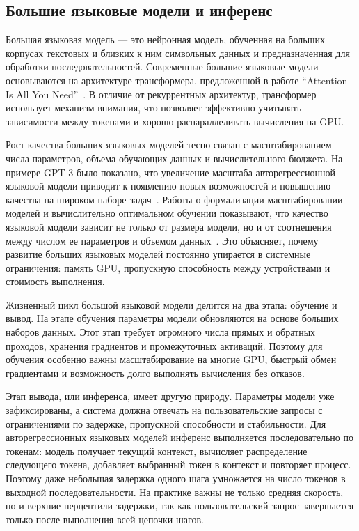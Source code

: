\subsection{Большие языковые модели и инференс}

Большая языковая модель --- это нейронная модель, обученная на больших корпусах текстовых и близких к ним символьных данных и предназначенная для обработки последовательностей. Современные большие языковые модели основываются на архитектуре трансформера, предложенной в работе ``Attention Is All You Need''~\cite{vaswani2017attention}. В отличие от рекуррентных архитектур, трансформер использует механизм внимания, что позволяет эффективно учитывать зависимости между токенами и хорошо распараллеливать вычисления на GPU.

Рост качества больших языковых моделей тесно связан с масштабированием числа параметров, объема обучающих данных и вычислительного бюджета. На примере GPT-3 было показано, что увеличение масштаба авторегрессионной языковой модели приводит к появлению новых возможностей и повышению качества на широком наборе задач~\cite{brown2020language}. Работы о формализации масштабировании моделей и вычислительно оптимальном обучении показывают, что качество языковой модели зависит не только от размера модели, но и от соотнешения между числом ее параметров и объемом данных~\cite{kaplan2020scaling,hoffmann2022training}. Это объясняет, почему развитие больших языковых моделей постоянно упирается в системные ограничения: память GPU, пропускную способность между устройствами и стоимость выполнения.

Жизненный цикл большой языковой модели делится на два этапа: обучение и вывод. На этапе обучения параметры модели обновляются на основе больших наборов данных. Этот этап требует огромного числа прямых и обратных проходов, хранения градиентов и промежуточных активаций. Поэтому для обучения особенно важны масштабирование на многие GPU, быстрый обмен градиентами и возможность долго выполнять вычисления без отказов.

Этап вывода, или инференса, имеет другую природу. Параметры модели уже зафиксированы, а система должна отвечать на пользовательские запросы с ограничениями по задержке, пропускной способности и стабильности. Для авторегрессионных языковых моделей инференс выполняется последовательно по токенам: модель получает текущий контекст, вычисляет распределение следующего токена, добавляет выбранный токен в контекст и повторяет процесс. Поэтому даже небольшая задержка одного шага умножается на число токенов в выходной последовательности. На практике важны не только средняя скорость, но и верхние перцентили задержки, так как пользовательский запрос завершается только после выполнения всей цепочки шагов.

